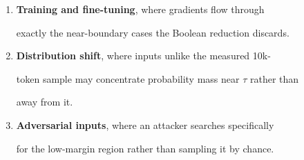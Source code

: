 \documentclass[11pt]{article}
\theoremstyle{definition}
\begin{document}
\begin{enumerate}





  \item \textbf{Training and fine-tuning}, where gradients flow through





    exactly the near-boundary cases the Boolean reduction discards.





  \item \textbf{Distribution shift}, where inputs unlike the measured 10k-





    token sample may concentrate probability mass near $\tau$ rather than





    away from it.





  \item \textbf{Adversarial inputs}, where an attacker searches specifically





    for the low-margin region rather than sampling it by chance.





\end{enumerate}
\end{document}
